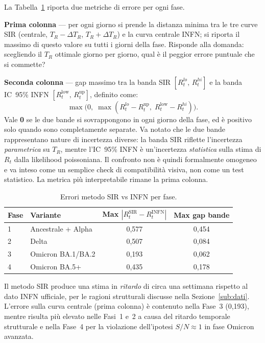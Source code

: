 \documentclass[12pt, a4paper]{article}
\begin{document}
La Tabella~\ref{tab:errori_sir} riporta due metriche di errore per ogni fase.

\textbf{Prima colonna} --- per ogni giorno si prende la distanza minima tra le tre curve SIR
(centrale, $T_R - \Delta T_R$, $T_R + \Delta T_R$) e la curva centrale INFN; si riporta
il massimo di questo valore su tutti i giorni della fase.
Risponde alla domanda: scegliendo il $T_R$ ottimale giorno per giorno, qual è il peggior
errore puntuale che si commette?

\textbf{Seconda colonna} --- gap massimo tra la banda SIR $[R_t^{lo},\, R_t^{hi}]$
e la banda IC~95\% INFN $[R_t^{\text{low}},\, R_t^{\text{up}}]$, definito come:
\[
    \max\bigl(0,\; \max(R_t^{lo} - R_t^{\text{up}},\; R_t^{\text{low}} - R_t^{hi})\bigr).
\]
Vale \textbf{0} se le due bande si sovrappongono in ogni giorno della fase,
ed è positivo solo quando sono completamente separate.
Va notato che le due bande rappresentano nature di incertezza diverse: la banda SIR
riflette l'incertezza \emph{parametrica} su $T_R$, mentre l'IC~95\% INFN è
un'incertezza \emph{statistica} sulla stima di $R_t$ dalla likelihood poissoniana.
Il confronto non è quindi formalmente omogeneo e va inteso come un semplice
check di compatibilità visiva, non come un test statistico.
La metrica più interpretabile rimane la prima colonna.

\begin{table}[htbp]
\centering
\caption{Errori metodo SIR vs INFN per fase.}
\label{tab:errori_sir}
\begin{tabular}{llcc}
\toprule
\textbf{Fase} & \textbf{Variante} & \textbf{Max $|R_t^{\text{SIR}} - R_t^{\text{INFN}}|$}
              & \textbf{Max gap bande} \\
\midrule
1 & Ancestrale + Alpha & 0{,}577 & 0{,}454 \\
2 & Delta              & 0{,}507 & 0{,}084 \\
3 & Omicron BA.1/BA.2  & 0{,}193 & 0{,}062 \\
4 & Omicron BA.5+      & 0{,}435 & 0{,}178 \\
\bottomrule
\end{tabular}
\end{table}

\noindent
Il metodo SIR produce una stima in \emph{ritardo} di circa una settimana rispetto al dato
INFN ufficiale, per le ragioni strutturali discusse nella Sezione~\ref{sub:dati}.
L'errore sulla curva centrale (prima colonna) è contenuto nella Fase~3 (0{,}193),
mentre risulta più elevato nelle Fasi~1 e~2 a causa del ritardo temporale strutturale
e nella Fase~4 per la violazione dell'ipotesi $S/N \approx 1$ in fase Omicron avanzata.
\end{document}
